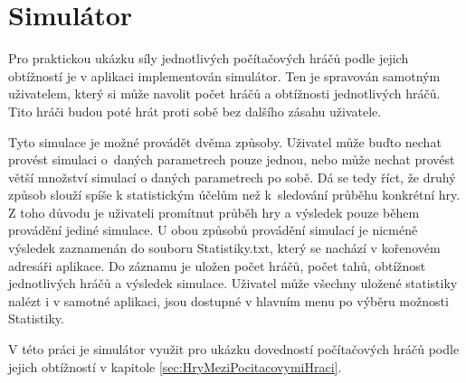 \section{Simulátor}
Pro praktickou ukázku síly jednotlivých počítačových hráčů podle jejich obtížností je v aplikaci implementován simulátor. Ten je spravován samotným uživatelem, který si může navolit počet hráčů a obtížnosti jednotlivých hráčů. Tito hráči budou poté hrát proti sobě bez dalšího zásahu uživatele. 

Tyto simulace je možné provádět dvěma způsoby. Uživatel může buďto nechat provést simulaci o~daných parametrech pouze jednou, nebo může nechat provést větší množství simulací o daných parametrech po sobě. Dá se tedy říct, že druhý způsob slouží spíše k statistickým účelům než k~sledování průběhu konkrétní hry. Z toho důvodu je uživateli promítnut průběh hry a výsledek pouze během provádění jediné simulace. U obou způsobů provádění simulací je nicméně výsledek zaznamenán do souboru \textsf{Statistiky.txt}, který se nachází v kořenovém adresáři aplikace. Do záznamu je uložen počet hráčů, počet tahů, obtížnost jednotlivých hráčů a výsledek simulace. Uživatel může všechny uložené statistiky nalézt i v samotné aplikaci, jsou dostupné v hlavním menu po výběru možnosti \textsf{Statistiky}.

V této práci je simulátor využit pro ukázku dovedností počítačových hráčů podle jejich obtížností v kapitole \ref{sec:HryMeziPocitacovymiHraci}.
\endinput